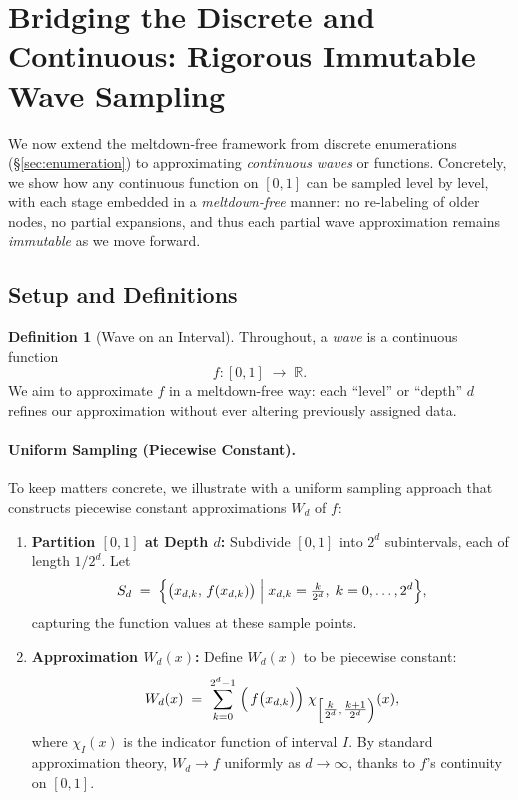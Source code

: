 \documentclass[acmsmall]{acmart}
\theoremstyle{definition}
\newtheorem{definition}[theorem]{Definition}
\theoremstyle{remark}
\begin{document}
 \section{Bridging the Discrete and Continuous: Rigorous Immutable Wave Sampling}
\label{sec:immutable-wave-sampling}

We now extend the meltdown-free framework from discrete enumerations
(\S\ref{sec:enumeration}) to approximating \emph{continuous waves} or functions.
Concretely, we show how any continuous function on $[0,1]$ can be sampled
level by level, with each stage embedded in a \emph{meltdown-free} manner:
no re-labeling of older nodes, no partial expansions, and thus each partial
wave approximation remains \emph{immutable} as we move forward.

\subsection{Setup and Definitions}
\label{subsec:wave-setup}

\begin{definition}[Wave on an Interval]
  \label{def:wave}
  Throughout, a \emph{wave} is a continuous function
  \[
    f : [0,1] \;\to\; \mathbb{R}.
  \]
  We aim to approximate $f$ in a meltdown-free way: each ``level'' or ``depth''
  $d$ refines our approximation without ever altering previously assigned data.
\end{definition}

\paragraph{Uniform Sampling (Piecewise Constant).}
To keep matters concrete, we illustrate with a uniform sampling approach
that constructs piecewise constant approximations $W_d$ of $f$:
\begin{enumerate}
  \item \textbf{Partition $[0,1]$ at Depth $d$:}  
    Subdivide $[0,1]$ into $2^d$ subintervals, each of length $1/2^d$. Let
    \[
      S_d \;=\; \Bigl\{\bigl(x_{d,k},\,f(x_{d,k})\bigr)\;\Big|\;
        x_{d,k} = \tfrac{k}{2^d},\; k=0,\dots,2^d
      \Bigr\},
    \]
    capturing the function values at these sample points.
  \item \textbf{Approximation $W_d(x)$:}  
    Define $W_d(x)$ to be piecewise constant:
    \[
      W_d(x) \;=\; \sum_{k=0}^{2^d-1} \;
      \Bigl(\,
        f\bigl(x_{d,k}\bigr)
      \Bigr)\;
      \chi_{\left[\tfrac{k}{2^d},\,\tfrac{k+1}{2^d}\right)}(x),
    \]
    where $\chi_I(x)$ is the indicator function of interval $I$. By standard
    approximation theory, $W_d \to f$ uniformly as $d\to\infty$, thanks to $f$'s
    continuity on $[0,1]$.
\end{enumerate}
\end{document}
